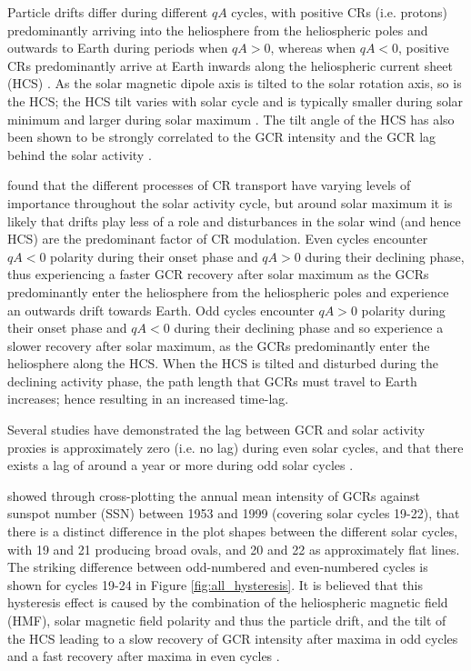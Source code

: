 Particle drifts differ during different $qA$ cycles, with positive CRs (i.e. protons) predominantly arriving into the heliosphere from the heliospheric poles and outwards to Earth during periods when $qA > 0$, whereas when $qA< 0$, positive CRs predominantly arrive at Earth inwards along the heliospheric current sheet (HCS) \citep{belov_large_2000, thomas_galactic_2014}. As the solar magnetic dipole axis is tilted to the solar rotation axis, so is the HCS; the HCS tilt varies with solar cycle and is typically smaller during solar minimum and larger during solar maximum \citep{owens_heliospheric_2013}. The tilt angle of the HCS has also been shown to be strongly correlated to the GCR intensity and the GCR lag behind the solar activity \citep{belov_large_2000, mavromichalaki_cosmic-ray_2007}. 

\cite{aslam_solar_2012, aslam_study_2015} found that the different processes of CR transport have varying levels of importance throughout the solar activity cycle, but around solar maximum it is likely that drifts play less of a role and disturbances in the solar wind (and hence HCS) are the predominant factor of CR modulation. Even cycles encounter $qA<0$ polarity during their onset phase and $qA>0$ during their declining phase, thus experiencing a faster GCR recovery after solar maximum as the GCRs predominantly enter the heliosphere from the heliospheric poles and experience an outwards drift towards Earth. Odd cycles encounter $qA>0$ polarity during their onset phase and $qA<0$ during their declining phase and so experience a slower recovery after solar maximum, as the GCRs predominantly enter the heliosphere along the HCS. When the HCS is tilted and disturbed during the declining activity phase, the path length that GCRs must travel to Earth increases; hence resulting in an increased time-lag.

Several studies have demonstrated the lag between GCR and solar activity proxies is approximately zero (i.e. no lag) during even solar cycles, and that there exists a lag of around a year or more during odd solar cycles \citep{usoskin_correlative_1998, mavromichalaki_cosmic-ray_2007, singh_solar_2008}.

\citet{van_allen_modulation_2000} showed through cross-plotting the annual mean intensity of GCRs against sunspot number (SSN) between 1953 and 1999 (covering solar cycles 19-22), that there is a distinct difference in the plot shapes between the different solar cycles, with 19 and 21 producing broad ovals, and 20 and 22 as approximately flat lines. The striking difference between odd-numbered and even-numbered cycles is shown for cycles 19-24 in Figure \ref{fig:all_hysteresis}. It is believed that this hysteresis effect is caused by the combination of the heliospheric magnetic field (HMF), solar magnetic field polarity and thus the particle drift, and the tilt of the HCS leading to a slow recovery of GCR intensity after maxima in odd cycles and a fast recovery after maxima in even cycles  \citep{van_allen_modulation_2000, belov_large_2000, thomas_22-year_2014}.


